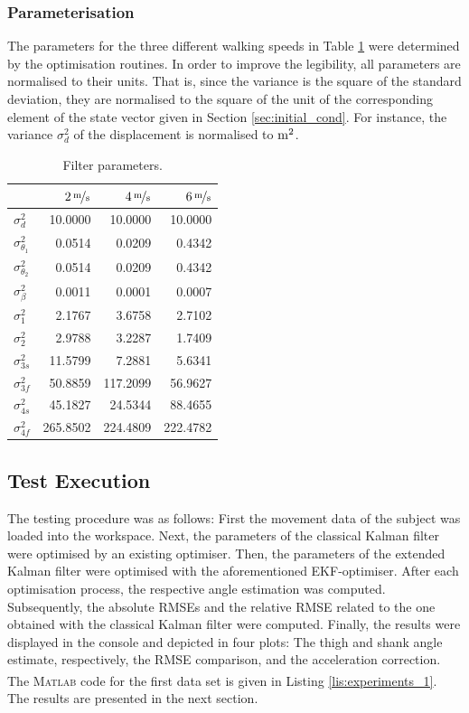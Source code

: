 \subsubsection{Parameterisation}

The parameters for the three different walking speeds in Table \ref{tab:parameters} were determined by the optimisation routines. In order to improve the legibility, all parameters are normalised to their units. That is, since the variance is the square of the standard deviation, they are normalised to the square of the unit of the corresponding element of the state vector given in Section \ref{sec:initial_cond}. For instance, the variance $\sigma^2_d$ of the displacement is normalised to $\unit[]{m^2}$.

\newcommand{\ra}[1]{\renewcommand{\arraystretch}{#1}}
\begin{table}\centering
\ra{1.3}
\begin{tabular}{@{}lrrr@{}}\toprule
 & $\unitfrac[2]{m}{s}$ & $\unitfrac[4]{m}{s}$ & $\unitfrac[6]{m}{s}$ \\
\midrule
$\sigma^2_d$ & 10.0000 & 10.0000 & 10.0000 \\
$\sigma^2_{\theta_1}$ & 0.0514 & 0.0209 & 0.4342 \\
$\sigma^2_{\theta_2}$ & 0.0514 & 0.0209 & 0.4342 \\
$\sigma^2_{\beta}$ & 0.0011 & 0.0001 & 0.0007 \\
$\sigma^2_1$ & 2.1767 & 3.6758 & 2.7102 \\
$\sigma^2_2$ & 2.9788 & 3.2287 & 1.7409 \\
$\sigma^2_{3s}$ & 11.5799 & 7.2881 & 5.6341 \\
$\sigma^2_{3f}$ & 50.8859 & 117.2099 & 56.9627 \\
$\sigma^2_{4s}$ & 45.1827 & 24.5344 & 88.4655 \\
$\sigma^2_{4f}$ & 265.8502 & 224.4809 & 222.4782 \\
\bottomrule
\end{tabular}
\caption{Filter parameters.}
\label{tab:parameters}
\end{table}

\subsection{Test Execution}

The testing procedure was as follows: First the movement data of the subject was loaded into the workspace. Next, the parameters of the classical Kalman filter were optimised by an existing optimiser. Then, the parameters of the extended Kalman filter were optimised with the aforementioned EKF-optimiser. After each optimisation process, the respective angle estimation was computed. Subsequently, the absolute RMSEs and the relative RMSE related to the one obtained with the classical Kalman filter were computed. Finally, the results were displayed in the console and depicted in four plots: The thigh and shank angle estimate, respectively, the RMSE comparison, and the acceleration correction. The \textsc{Matlab}\textsuperscript{\textregistered} code for the first data set is given in Listing \ref{lis:experiments_1}. The results are presented in the next section.

